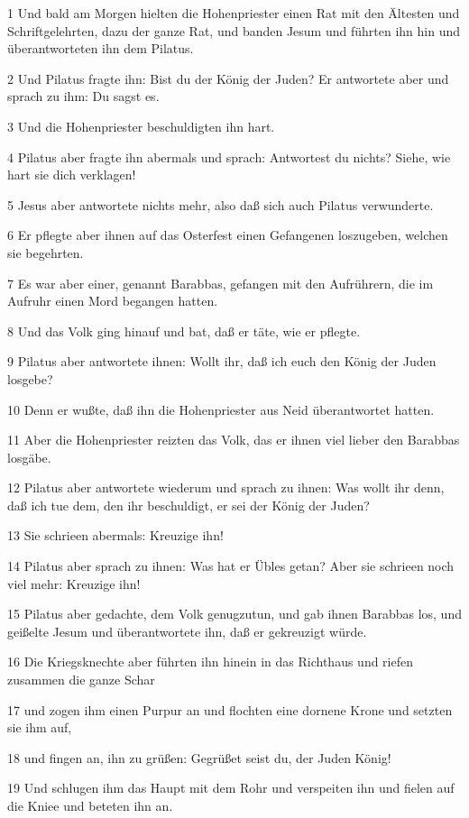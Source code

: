 \par 1 Und bald am Morgen hielten die Hohenpriester einen Rat mit den Ältesten und Schriftgelehrten, dazu der ganze Rat, und banden Jesum und führten ihn hin und überantworteten ihn dem Pilatus.
\par 2 Und Pilatus fragte ihn: Bist du der König der Juden? Er antwortete aber und sprach zu ihm: Du sagst es.
\par 3 Und die Hohenpriester beschuldigten ihn hart.
\par 4 Pilatus aber fragte ihn abermals und sprach: Antwortest du nichts? Siehe, wie hart sie dich verklagen!
\par 5 Jesus aber antwortete nichts mehr, also daß sich auch Pilatus verwunderte.
\par 6 Er pflegte aber ihnen auf das Osterfest einen Gefangenen loszugeben, welchen sie begehrten.
\par 7 Es war aber einer, genannt Barabbas, gefangen mit den Aufrührern, die im Aufruhr einen Mord begangen hatten.
\par 8 Und das Volk ging hinauf und bat, daß er täte, wie er pflegte.
\par 9 Pilatus aber antwortete ihnen: Wollt ihr, daß ich euch den König der Juden losgebe?
\par 10 Denn er wußte, daß ihn die Hohenpriester aus Neid überantwortet hatten.
\par 11 Aber die Hohenpriester reizten das Volk, das er ihnen viel lieber den Barabbas losgäbe.
\par 12 Pilatus aber antwortete wiederum und sprach zu ihnen: Was wollt ihr denn, daß ich tue dem, den ihr beschuldigt, er sei der König der Juden?
\par 13 Sie schrieen abermals: Kreuzige ihn!
\par 14 Pilatus aber sprach zu ihnen: Was hat er Übles getan? Aber sie schrieen noch viel mehr: Kreuzige ihn!
\par 15 Pilatus aber gedachte, dem Volk genugzutun, und gab ihnen Barabbas los, und geißelte Jesum und überantwortete ihn, daß er gekreuzigt würde.
\par 16 Die Kriegsknechte aber führten ihn hinein in das Richthaus und riefen zusammen die ganze Schar
\par 17 und zogen ihm einen Purpur an und flochten eine dornene Krone und setzten sie ihm auf,
\par 18 und fingen an, ihn zu grüßen: Gegrüßet seist du, der Juden König!
\par 19 Und schlugen ihm das Haupt mit dem Rohr und verspeiten ihn und fielen auf die Kniee und beteten ihn an.
